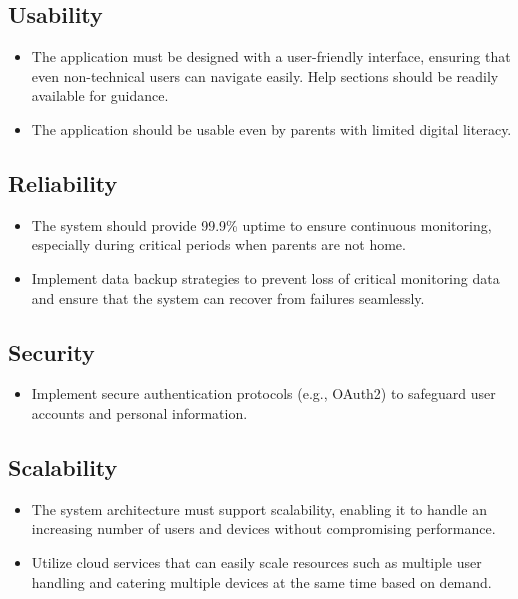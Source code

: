\documentclass[12pt,a4paper]{report}
\begin{document}
\subsection{Usability}
\begin{itemize}
  \item The application must be designed with a user-friendly interface, ensuring that even non-technical users can navigate easily. Help sections should be readily available for guidance.
  \item The application should be usable even by parents with limited digital literacy.
\end{itemize}

\subsection{Reliability}
\begin{itemize}
  \item The system should provide 99.9\% uptime to ensure continuous monitoring, especially during critical periods when parents are not home.
  \item Implement data backup strategies to prevent loss of critical monitoring data and ensure that the system can recover from failures seamlessly.
\end{itemize}

\subsection{Security}
\begin{itemize}
  \item Implement secure authentication protocols (e.g., OAuth2) to safeguard user accounts and personal information.
\end{itemize}

\subsection{Scalability}
\begin{itemize}
  \item The system architecture must support scalability, enabling it to handle an increasing number of users and devices without compromising performance.
  \item Utilize cloud services that can easily scale resources such as multiple user handling and catering multiple devices at the same time based on demand.
\end{itemize}
\end{document}
